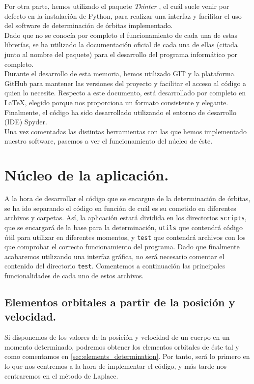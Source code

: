 Por otra parte, hemos utilizado el paquete \textit{Tkinter} \cite{tkinter}, el cuál suele venir por defecto en la instalación de Python, para realizar una interfaz y facilitar el uso del software de determinación de órbitas implementado.\\

Dado que no se conocía por completo el funcionamiento de cada una de estas librerías, se ha utilizado la documentación oficial de cada una de ellas (citada junto al nombre del paquete) para el desarrollo del programa informático por completo.\\

Durante el desarrollo de esta memoria, hemos utilizado GIT y la plataforma GitHub para mantener las versiones del proyecto y facilitar el acceso al código a quien lo necesite. Respecto a este documento, está desarrollado por completo en \LaTeX, elegido porque nos proporciona un formato consistente y elegante. Finalmente, el código ha sido desarrollado utilizando el entorno de desarrollo (IDE) Spyder.\\

Una vez comentadas las distintas herramientas con las que hemos implementado nuestro software, pasemos a ver el funcionamiento del núcleo de éste.\\

\section{Núcleo de la aplicación.}
\label{sec:kernel}
A la hora de desarrollar el código que se encargue de la determinación de órbitas, se ha ido separando el código en función de cuál es su cometido en diferentes archivos y carpetas. Así, la aplicación estará dividida en los directorios \texttt{scripts}, que se encargará de la base para la determinación, \texttt{utils} que contendrá código útil para utilizar en diferentes momentos, y \texttt{test} que contendrá archivos con los que comprobar el correcto funcionamiento del programa. Dado que finalmente acabaremos utilizando una interfaz gráfica, no será necesario comentar el contenido del directorio \texttt{test}. Comentemos a continuación las principales funcionalidades de cada uno de estos archivos.\\

\subsection{Elementos orbitales a partir de la posición y velocidad.}
\label{subsec:orbital_elements_code}
Si disponemos de los valores de la posición y velocidad de un cuerpo en un momento determinado, podremos obtener los elementos orbitales de éste tal y como comentamos en \ref{sec:elements_determination}. Por tanto, será lo primero en lo que nos centremos a la hora de implementar el código, y más tarde nos centraremos en el método de Laplace.\\

